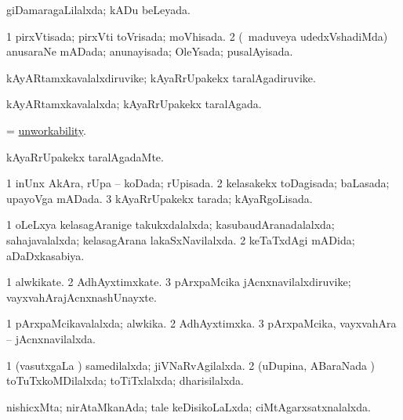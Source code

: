 \bentry
{} 
\gl{\gu}
\expl{}
\bmng
giDamaragaLilalxda; kADu beLeyada. 
\emng
\eentry

\bentry
{} 
\gl{\gu}
\expl{}
\bmng
\bnum
\num{1} pirxVtisada; pirxVti toVrisada; moVhisada. 
\num{2} (\kanmu\ maduveya udedxVshadiMda) anusaraNe mADada; anunayisada; OleYsada; pusalAyisada. 
\enum
\emng
\eentry

\bentry
{} 
\gl{\nA}
\expl{}
\bmng
kAyARtamxkavalalxdiruvike; kAyaRrUpakekx taralAgadiruvike. 
\emng
\eentry

\bentry
{} 
\gl{\gu}
\expl{}
\bmng
kAyARtamxkavalalxda; kAyaRrUpakekx taralAgada. 
\emng
\eentry

\bentry
{} 
\gl{\nA}
\expl{}
\bmng
= \hyperlink{unworkability}{unworkability}. 
\emng
\eentry

\bentry
{} 
\gl{\kirxvi}
\expl{}
\bmng
kAyaRrUpakekx taralAgadaMte. 
\emng
\eentry

\bentry
{} 
\gl{\gu}
\expl{}
\bmng
\bnum
\num{1} inUnx AkAra, rUpa -- koDada; rUpisada. 
\num{2} kelasakekx toDagisada; baLasada; upayoVga mADada. 
\num{3} kAyaRrUpakekx tarada; kAyaRgoLisada. 
\enum
\emng
\eentry

\bentry
{} 
\gl{\gu}
\expl{}
\bmng
\bnum
\num{1} oLeLxya kelasagAranige takukxdalalxda; kasubaudAranadalalxda; sahajavalalxda; kelasagArana lakaSxNavilalxda. 
\num{2} keTaTxdAgi mADida; aDaDxkasabiya. 
\enum
\emng
\eentry

\bentry
{} 
\gl{\nA}
\expl{}
\bmng
\bnum
\num{1} alwkikate. 
\num{2} AdhAyxtimxkate. 
\num{3} pArxpaMcika jAcnxnavilalxdiruvike; vayxvahArajAcnxnashUnayxte. 
\enum
\emng
\eentry

\bentry
{} 
\gl{\gu}
\expl{}
\bmng
\bnum
\num{1} pArxpaMcikavalalxda; alwkika. 
\num{2} AdhAyxtimxka. 
\num{3} pArxpaMcika, vayxvahAra -- jAcnxnavilalxda. 
\enum
\emng
\eentry

\bentry
{} 
\gl{\gu}
\expl{}
\bmng
\bnum
\num{1} (vasutxgaLa \vi) samedilalxda; jiVNaRvAgilalxda. 
\num{2} (uDupina, ABaraNada \vi) toTuTxkoMDilalxda; toTiTxlalxda; dharisilalxda. 
\enum
\emng
\eentry

\bentry
{} 
\gl{\gu}
\expl{}
\bmng
nishicxMta; nirAtaMkanAda; tale keDisikoLaLxda; ciMtAgarxsatxnalalxda. 
\emng
\eentry

